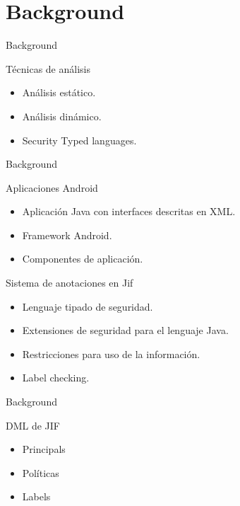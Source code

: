\section{Background}
\begin{frame}{Background}
	\begin{block}{Técnicas de análisis}
	\begin{itemize}
	  \item Análisis estático. \pause 
	  \item Análisis dinámico. \pause
	  \item Security Typed languages.
	\end{itemize}
	\end{block}
\end{frame}
\begin{frame}{Background}
	\begin{block}{Aplicaciones Android}
	\begin{itemize}
	  \item Aplicación Java con interfaces descritas en XML.
	  \item Framework Android.
	  \item Componentes de aplicación.
	\end{itemize}
	\end{block}
	\begin{block}{Sistema de anotaciones en Jif}
	\begin{itemize}
	  \item Lenguaje tipado de seguridad.
	  \item Extensiones de seguridad para el lenguaje Java.
	  \item Restricciones para uso de la información.
	  \item Label checking.
	\end{itemize}
	\end{block}
\end{frame}
\begin{frame}{Background}
	\begin{block}{DML de JIF}
	\begin{itemize}
	  \item Principals
	  \item Políticas
	  \item Labels
	\end{itemize}
	\end{block}
\end{frame}